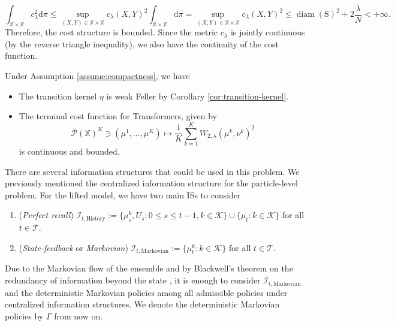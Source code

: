 \documentclass[11pt]{article}
\newcommand{\XX}{\mathbb{X}}
\newcommand{\cI}{\mathcal{I}}
\newcommand{\cK}{\mathcal{K}}
\newcommand{\cP}{\mathcal{P}}
\newcommand{\cT}{\mathcal{T}}
\newcommand{\de}{\mathrm{d}} %
\begin{document}
\begin{equation*}
    \int_{\XX\times\XX}c_\lambda^2\de\pi \leq \sup_{(X,Y)\in\XX\times\XX}c_\lambda(X,Y)^2\int_{\XX\times\XX}\de\pi = \sup_{(X,Y)\in\XX\times\XX}c_\lambda(X,Y)^2 \leq \operatorname{diam}(\mathrm{S})^2 + 2\frac{\lambda}{N} < +\infty.
\end{equation*}
Therefore, the cost structure is bounded. Since the metric $c_\lambda$ is jointly continuous (by the reverse triangle inequality), we also have the continuity of the cost function. 
\begin{remark}\label{remark:properties-of-transformers}
    Under Assumption \ref{assume:compactness}, we have
    \begin{itemize}
        \item[(R1)] The transition kernel $\eta$ is weak Feller by Corollary \ref{cor:transition-kernel}.
        \item[(R2)] The terminal cost function for Transformers, given by
        \begin{equation*}
            \cP(\XX)^K\ni(\mu^1,\ldots,\mu^K)\mapsto\frac{1}{K}\sum_{k=1}^K W_{2,\lambda}(\mu^k,\nu^k)^2
        \end{equation*}
        is continuous and bounded. 
    \end{itemize}
\end{remark}
There are several information structures that could be used in this problem. We previously mentioned the centralized information structure for the particle-level problem. For the lifted model, we have two main ISs to consider
\begin{enumerate}
    \item (\emph{Perfect recall}) $\cI_{t,\text{History}} := \{\mu_s^k, U_s : 0 \leq s \leq t-1, k\in\cK\}\cup \{\mu_t : k\in\cK\}$ for all $t\in\cT$.
    \item (\emph{State-feedback} or \emph{Markovian}) $\cI_{t,\text{Markovian}} := \{\mu_t^k : k\in\cK\}$ for all $t\in\cT$.
\end{enumerate}
Due to the Markovian flow of the ensemble and by Blackwell's theorem on the redundancy of information beyond the state \citep{blackwell1964memoryless}, it is enough to consider $\cI_{t,\text{Markovian}}$ and the deterministic Markovian policies among all admissible policies under centralized information structures. We denote the deterministic Markovian policies by $\Gamma$ from now on. 
\end{document}
